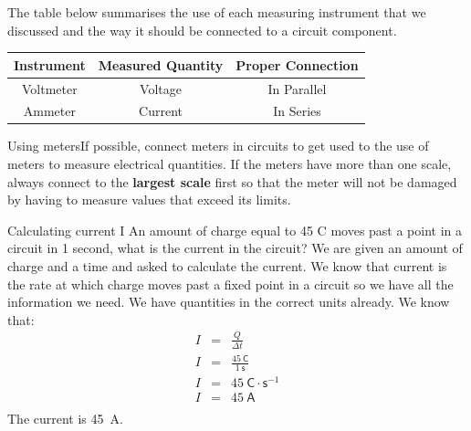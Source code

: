 
The table below summarises the use of each measuring instrument
that we discussed and the way it should be connected to a circuit
component.

\begin{center}
\begin{tabular}{ | c | c | c | }
\hline 
\textbf{Instrument} & \textbf{Measured Quantity} & \textbf{Proper Connection} \\ \hline \hline 
Voltmeter & Voltage & In Parallel \\ \hline Ammeter &
Current & In Series \\ \hline
\hline
\end{tabular}
\end{center}


\begin{activity}{Using meters}If possible, 
connect meters in circuits to get used to the use of meters to
measure electrical quantities. If the meters have more than one
scale, always connect to the \textbf{largest scale} first so that the meter
will not be damaged by having to measure values that exceed its
limits.
\end{activity}



\begin{wex}{Calculating current I}
{An amount of charge equal to 45 C moves past a point in a circuit in 1 second, what is the current in the circuit?
}{%
We are given an amount of charge and a time and asked to calculate the current. We know that current is the rate at which charge moves past a fixed point in a circuit so we have all the information we need. We have quantities in the correct units already.
We know that:
\begin{eqnarray*}
I &=& \frac{Q}{\Delta t} \\
I &=& \frac{45~\mathsf{C}}{1~\mathsf{s}} \\
I &=& 45~\mathsf{C} \cdot \mathsf{s}^{-1} \\
I &=& 45~\mathsf{A} \\
\end{eqnarray*}
The current is 45~A.
}
\end{wex}

